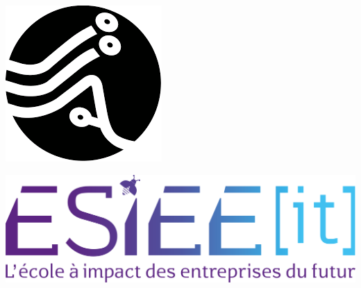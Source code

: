 \documentclass[12pt]{article}
\begin{document}
\begin{titlepage}
  \centering
  \hfill
  \begin{minipage}{0.45\textwidth}
    \centering
    \includegraphics[width=0.45\linewidth]{img/iia-logo.png}
  \end{minipage}
  \hfill
  \begin{minipage}{0.45\textwidth}
    \centering
    \includegraphics[width=0.65\linewidth]{img/esiee-logo.png}
  \end{minipage}
  \vspace*{2cm}


\end{titlepage}
\end{document}
